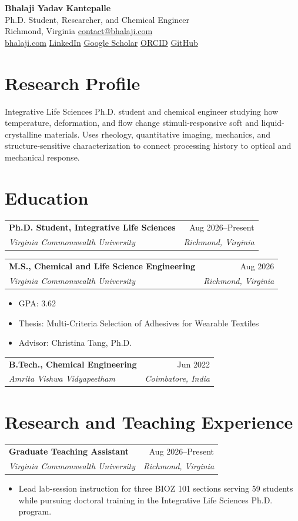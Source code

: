 \documentclass[10pt,letterpaper]{article}
\makeatletter
\newcommand{\entry}[4]{%
  \begin{tabularx}{\textwidth}{@{}Xr@{}}
    {\bfseries\color{Ink} #1} & {\color{Muted}\small #2}\\
    {\itshape #3} & {\itshape\color{Muted}\small #4}
  \end{tabularx}\vspace{1pt}
}
\newcommand{\contactsep}{\hspace{0.45em}{\color{Rule}|}\hspace{0.45em}}
\newcommand{\cvlink}[2]{\href{#1}{#2}}
\makeatother
\begin{document}
\begin{center}
  {\fontsize{25}{28}\selectfont\bfseries\color{Ink} Bhalaji Yadav Kantepalle}\\[3pt]
  {\large\color{Teal} Ph.D. Student, Researcher, and Chemical Engineer}\\[5pt]
  {\small Richmond, Virginia \contactsep \cvlink{mailto:contact@bhalaji.com}{contact@bhalaji.com}}\\[2pt]
  {\small \cvlink{https://bhalaji.com}{bhalaji.com} \contactsep \cvlink{https://www.linkedin.com/in/kbhalajiyadav}{LinkedIn} \contactsep \cvlink{https://scholar.google.com/citations?hl=en\&user=DrfbtX4AAAAJ}{Google Scholar} \contactsep \cvlink{https://orcid.org/0000-0003-0551-6172}{ORCID} \contactsep \cvlink{https://github.com/kbhalajiyadav}{GitHub}}
\end{center}
\vspace{2pt}

\section{Research Profile}
\color{Ink} Integrative Life Sciences Ph.D. student and chemical engineer studying how temperature, deformation, and flow change stimuli-responsive soft and liquid-crystalline materials. Uses rheology, quantitative imaging, mechanics, and structure-sensitive characterization to connect processing history to optical and mechanical response.\color{black}

\section{Education}
\entry{Ph.D. Student, Integrative Life Sciences}{Aug 2026–Present}{Virginia Commonwealth University}{Richmond, Virginia}

\entry{M.S., Chemical and Life Science Engineering}{Aug 2026}{Virginia Commonwealth University}{Richmond, Virginia}
\begin{itemize}
  \item GPA: 3.62
  \item Thesis: Multi-Criteria Selection of Adhesives for Wearable Textiles
  \item Advisor: Christina Tang, Ph.D.
\end{itemize}

\entry{B.Tech., Chemical Engineering}{Jun 2022}{Amrita Vishwa Vidyapeetham}{Coimbatore, India}


\section{Research and Teaching Experience}
\entry{Graduate Teaching Assistant}{Aug 2026–Present}{Virginia Commonwealth University}{Richmond, Virginia}
\begin{itemize}
  \item Lead lab-session instruction for three BIOZ 101 sections serving 59 students while pursuing doctoral training in the Integrative Life Sciences Ph.D. program.
\end{itemize}
\end{document}
